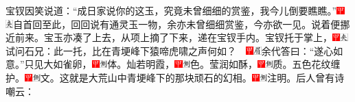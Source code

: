 宝钗因笑说道：``成日家说你的这玉，究竟未曾细细的赏鉴，我今儿倒要瞧瞧。''{\includegraphics[width=3mm]{../Images/00002}\includegraphics[width=3mm]{../Images/00012}\footnotesize \kaishu 自首回至此，回回说有通灵玉一物，余亦未曾细细赏鉴，今亦欲一见。}说着便挪近前来。宝玉亦凑了上去，从项上摘了下来，递在宝钗手内。宝钗托于掌上，{\includegraphics[width=3mm]{../Images/00002}\includegraphics[width=3mm]{../Images/00012}\footnotesize \kaishu 试问石兄：此一托，比在青埂峰下猿啼虎啸之声何如？　\includegraphics[width=3mm]{../Images/00002}\includegraphics[width=3mm]{../Images/00010}\footnotesize \kaishu 余代答曰：``遂心如意。''}只见大如雀卵，{\includegraphics[width=3mm]{../Images/00002}\includegraphics[width=3mm]{../Images/00011}\footnotesize \kaishu 体。}灿若明霞，{\includegraphics[width=3mm]{../Images/00002}\includegraphics[width=3mm]{../Images/00011}\footnotesize \kaishu 色。}莹润如酥，{\includegraphics[width=3mm]{../Images/00002}\includegraphics[width=3mm]{../Images/00011}\footnotesize \kaishu 质。}五色花纹缠护。{\includegraphics[width=3mm]{../Images/00002}\includegraphics[width=3mm]{../Images/00011}\footnotesize \kaishu 文。}这就是大荒山中青埂峰下的那块顽石的幻相。{\includegraphics[width=3mm]{../Images/00002}\includegraphics[width=3mm]{../Images/00011}\footnotesize \kaishu 注明。}后人曾有诗嘲云：

